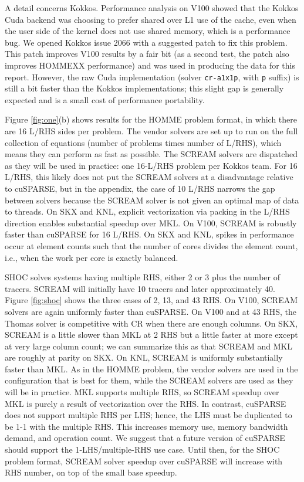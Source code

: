 \documentclass[10pt,twocolumn]{article}
\begin{document}
A detail concerns Kokkos.
Performance analysis on V100 showed that the Kokkos Cuda backend was choosing
to prefer shared over L1 use of the cache,
even when the user side of the kernel does not use shared memory,
which is a performance bug.
We opened Kokkos issue 2066 with a suggested patch to fix this problem.
This patch improves V100 results by a fair bit (as a second test, the patch also improves HOMMEXX performance) and was used in producing the data for this report.
However, the raw Cuda implementation (solver {\tt cr-a1x1p}, with {\tt p} suffix) is still a bit faster than the Kokkos implementations;
this slight gap is generally expected and is a small cost of performance portability.

Figure \ref{fig:one}(b) shows results for the HOMME problem format,
in which there are 16 L/RHS sides per problem.
The vendor solvers are set up to run on the full collection of equations (number of problems times number of L/RHS),
which means they can perform as fast as possible.
The SCREAM solvers are dispatched as they will be used in practice:
one 16-L/RHS problem per Kokkos team.
For 16 L/RHS, this likely does not put the SCREAM solvers at a disadvantage relative to cuSPARSE,
but in the appendix, the case of 10 L/RHS narrows the gap between solvers
because the SCREAM solver is not given an optimal map of data to threads.
On SKX and KNL, explicit vectorization via packing in the L/RHS direction enables
substantial speedup over MKL.
On V100, SCREAM is robustly faster than cuSPARSE for 16 L/RHS.
On SKX and KNL, spikes in performance occur at element counts such that the number of cores divides the element count, i.e., when the work per core is exactly balanced.

SHOC solves systems having multiple RHS, either 2 or 3 plus the number of tracers.
SCREAM will initially have 10 tracers and later approximately 40.
Figure \ref{fig:shoc} shows the three cases of 2, 13, and 43 RHS.
On V100, SCREAM solvers are again uniformly faster than cuSPARSE.
On V100 and at 43 RHS, the Thomas solver is competitive with CR when there are enough columns.
On SKX, SCREAM is a little slower than MKL at 2 RHS but a little faster at more except at very large column count;
we can summarize this as that SCREAM and MKL are roughly at parity on SKX.
On KNL, SCREAM is uniformly substantially faster than MKL.
As in the HOMME problem, the vendor solvers are used in the configuration that is best for them,
while the SCREAM solvers are used as they will be in practice.
MKL supports multiple RHS, so SCREAM speedup over MKL is purely a result of vectorization over the RHS.
In contrast, cuSPARSE does not support multiple RHS per LHS;
hence, the LHS must be duplicated to be 1-1 with the multiple RHS.
This increases memory use, memory bandwidth demand, and operation count.
We suggest that a future version of cuSPARSE should support the 1-LHS/multiple-RHS use case.
Until then, for the SHOC problem format, SCREAM solver speedup over cuSPARSE will increase with RHS number,
on top of the small base speedup.
\end{document}

